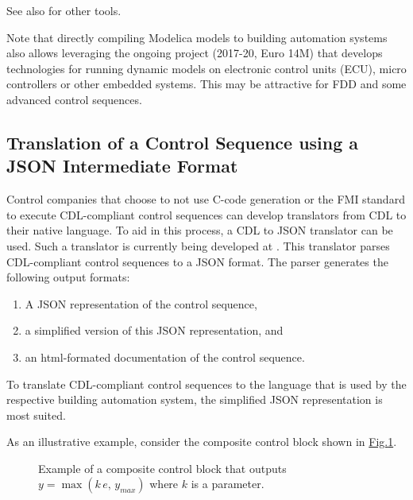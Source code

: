 \documentclass[letterpaper,10pt, openany,english]{sphinxmanual}
\let\sphinxpxdimen\pdfpxdimen\else\newdimen\sphinxpxdimen
\begin{document}
See also  for other tools.

Note that directly compiling Modelica models to building automation systems
also allows leveraging the ongoing 
project (2017-20, Euro 14M) that develops technologies
for running dynamic models on electronic control units (ECU),
micro controllers or other embedded systems.
This may be attractive for FDD and some advanced control sequences.


\subsection{Translation of a Control Sequence using a JSON Intermediate Format}
\label{\detokenize{codeGeneration:translation-of-a-control-sequence-using-a-json-intermediate-format}}\label{\detokenize{codeGeneration:sec-cdl-to-json-simp}}
Control companies that choose to not use C-code generation or the FMI standard to
execute CDL-compliant control sequences can develop translators from
CDL to their native language. To aid in this process, a CDL to JSON translator
can be used. Such a translator is currently being developed at
.
This translator parses CDL-compliant control sequences to a JSON format.
The parser generates the following output formats:
\begin{enumerate}
\def\theenumi{\arabic{enumi}}
\def\labelenumi{\theenumi .}
\makeatletter\def\p@enumii{\p@enumi \theenumi .}\makeatother
\item {} 
A JSON representation of the control sequence,

\item {} 
a simplified version of this JSON representation, and

\item {} 
an html-formated documentation of the control sequence.

\end{enumerate}

To translate CDL-compliant control sequences to the language that is used
by the respective building automation system, the simplified JSON representation
is most suited.

As an illustrative example, consider the composite control block shown in
\hyperref[\detokenize{codeGeneration:fig-exp-custom-control-block}]{Fig.\@ \ref{\detokenize{codeGeneration:fig-exp-custom-control-block}}}.

\begin{figure}[htbp]
\centering
\capstart

\noindent\sphinxincludegraphics[width=500\sphinxpxdimen]{{CustomPWithLimiter1}.pdf}
\caption{Example of a composite control block that outputs \(y = \max( k \, e, \, y_{max})\)
where \(k\) is a parameter.}\label{\detokenize{codeGeneration:id4}}\label{\detokenize{codeGeneration:fig-exp-custom-control-block}}\end{figure}
\end{document}
